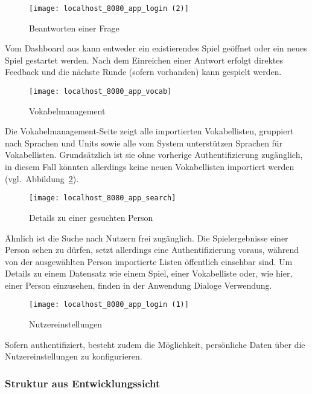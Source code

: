 \begin{figure}[H]
    \centering
    \texttt{[image: localhost\_8080\_app\_login (2)]}
    \caption[]{Beantworten einer Frage}
    \label{fig:fegame}
\end{figure}

Vom Dashboard aus kann entweder ein existierendes Spiel geöffnet oder ein neues Spiel gestartet werden.
Nach dem Einreichen einer Antwort erfolgt direktes Feedback und die nächste Runde (sofern vorhanden) kann
gespielt werden.

\begin{figure}[H]
    \centering
    \texttt{[image: localhost\_8080\_app\_vocab]}
    \caption[]{Vokabelmanagement}
    \label{fig:fevocab}
\end{figure}

Die Vokabelmanagement-Seite zeigt alle importierten Vokabellisten, gruppiert nach Sprachen und Units sowie alle vom System
unterstützen Sprachen für Vokabellisten.
Grundsätzlich ist sie ohne vorherige Authentifizierung zugänglich, in diesem Fall könnten allerdings keine neuen Vokabellisten importiert werden (vgl.\ Abbildung~\ref{fig:fevocab}).

\begin{figure}[H]
    \centering
    \texttt{[image: localhost\_8080\_app\_search]}
    \caption[]{Details zu einer gesuchten Person}
    \label{fig:fesearch}
\end{figure}

Ähnlich ist die Suche nach Nutzern frei zugänglich.
Die Spielergebnisse einer Person sehen zu dürfen, setzt allerdings eine Authentifizierung voraus, während von der ausgewählten Person importierte Listen öffentlich einsehbar sind.
Um Details zu einem Datensatz wie einem Spiel, einer Vokabelliste oder, wie hier, einer Person einzusehen, finden in der Anwendung Dialoge Verwendung.

\begin{figure}[H]
    \centering
    \texttt{[image: localhost\_8080\_app\_login (1)]}
    \caption[]{Nutzereinstellungen}
    \label{fig:fesettings}
\end{figure}

Sofern authentifiziert, besteht zudem die Möglichkeit, persönliche Daten über die Nutzereinstellungen zu konfigurieren.

\subsubsection{Struktur aus Entwicklungssicht}

